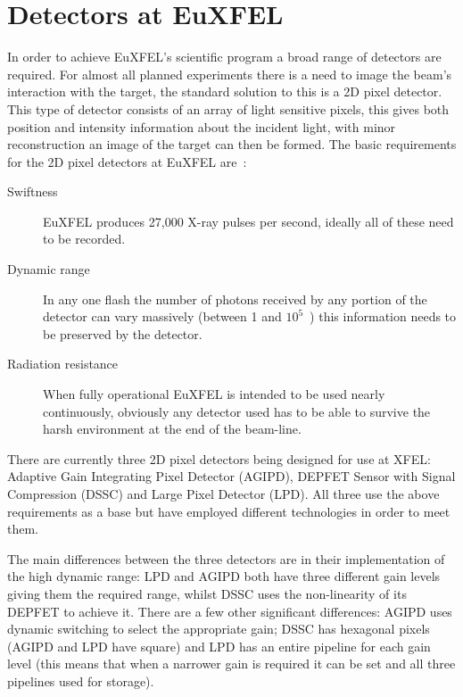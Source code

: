 \section{Detectors at EuXFEL} %
\label{sub:detectors_at_euxfel}
In order to achieve EuXFEL's scientific program a broad range of detectors are required. For almost all planned experiments there is a need to image the beam's interaction with the target, the standard solution to this is a 2D pixel detector. This type of detector consists of an array of light sensitive pixels, this gives both position and intensity information about the incident light, with minor reconstruction an image of the target can then be formed. The basic requirements for the 2D pixel detectors at EuXFEL are~\cite{xfel_website}:
\begin{description}
    \item[Swiftness] EuXFEL produces 27,000 X-ray pulses per second, ideally all of these need to be recorded.
    \item[Dynamic range] In any one flash the number of photons received by any portion of the detector can vary massively (between 1 and \(10^5\)~\cite{lpd_manual}) this information needs to be preserved by the detector.
    \item[Radiation resistance] When fully operational EuXFEL is intended to be used nearly continuously, obviously any detector used has to be able to survive the harsh environment at the end of the beam-line.
\end{description}

There are currently three 2D pixel detectors being designed for use at XFEL: Adaptive Gain Integrating Pixel Detector (AGIPD), DEPFET Sensor with Signal Compression (DSSC) and Large Pixel Detector (LPD). All three use the above requirements as a base but have employed different technologies in order to meet them.

The main differences between the three detectors are in their implementation of the high dynamic range: LPD and AGIPD both have three different gain levels giving them the required range, whilst DSSC uses the non-linearity of its DEPFET to achieve it. There are a few other significant differences: AGIPD uses dynamic switching to select the appropriate gain; DSSC has hexagonal pixels (AGIPD and LPD have square) and LPD has an entire pipeline for each gain level (this means that when a narrower gain is required it can be set and all three pipelines used for storage). 

